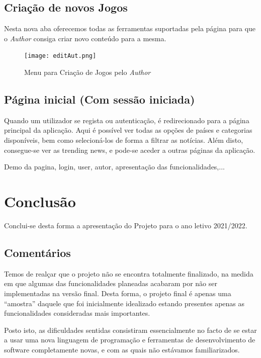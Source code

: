 \documentclass[11pt,a4paper]{report}
\begin{document}
\newpage

\section{Criação de novos Jogos}
Nesta nova aba oferecemos todas as ferramentas suportadas pela página para que o \emph{Author} consiga criar novo conteúdo para a mesma.
\begin{figure}[h]
    \centering
    \texttt{[image: editAut.png]}
    \caption{Menu para Criação de Jogos pelo \emph{Author}}
    \label{fig:editAut}
\end{figure}

\section{Página inicial (Com sessão iniciada)}

Quando um utilizador se regista ou autenticação, é redirecionado para a página principal da aplicação. Aqui é possível ver todas as opções de países e categorias disponíveis, bem como selecioná-los de forma a filtrar as notícias. Além disto, consegue-se ver as trending news, e pode-se aceder a outras páginas da aplicação.

Demo da pagina, login, user, autor, apresentação das funcionalidades,...

\chapter{Conclusão}

Conclui-se desta forma a apresentação do Projeto para o ano letivo 2021/2022.

\section{Comentários}

Temos de realçar que o projeto não se encontra totalmente finalizado, na medida em que algumas das funcionalidades planeadas acabaram por não ser implementadas na versão final. Desta forma, o projeto final é apenas uma “amostra” daquele que foi inicialmente idealizado estando presentes apenas as funcionalidades consideradas mais importantes.

Posto isto, as dificuldades sentidas consistiram essencialmente no facto de se estar a usar uma nova linguagem de programação e ferramentas de desenvolvimento de software completamente novas, e com as quais não estávamos familiarizados.
\end{document}
